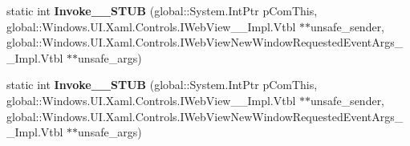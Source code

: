 \begin{DoxyCompactItemize}
\mbox{\label{struct_windows_1_1_foundation_1_1_typed_event_handler___a___windows___u_i___xaml___controls___wec42a721acbd095ac78e4a49a8bbda864_a51e483ef980be894be0ddaab1cc3d22f}} 
static int {\bfseries Invoke\+\_\+\+\_\+\+S\+T\+UB} (global\+::\+System.\+Int\+Ptr p\+Com\+This, global\+::\+Windows.\+U\+I.\+Xaml.\+Controls.\+I\+Web\+View\+\_\+\+\_\+\+Impl.\+Vtbl $\ast$$\ast$unsafe\+\_\+sender, global\+::\+Windows.\+U\+I.\+Xaml.\+Controls.\+I\+Web\+View\+New\+Window\+Requested\+Event\+Args\+\_\+\+\_\+\+Impl.\+Vtbl $\ast$$\ast$unsafe\+\_\+args)
\item 
\mbox{\label{struct_windows_1_1_foundation_1_1_typed_event_handler___a___windows___u_i___xaml___controls___wec42a721acbd095ac78e4a49a8bbda864_a51e483ef980be894be0ddaab1cc3d22f}} 
static int {\bfseries Invoke\+\_\+\+\_\+\+S\+T\+UB} (global\+::\+System.\+Int\+Ptr p\+Com\+This, global\+::\+Windows.\+U\+I.\+Xaml.\+Controls.\+I\+Web\+View\+\_\+\+\_\+\+Impl.\+Vtbl $\ast$$\ast$unsafe\+\_\+sender, global\+::\+Windows.\+U\+I.\+Xaml.\+Controls.\+I\+Web\+View\+New\+Window\+Requested\+Event\+Args\+\_\+\+\_\+\+Impl.\+Vtbl $\ast$$\ast$unsafe\+\_\+args)
\end{DoxyCompactItemize}
